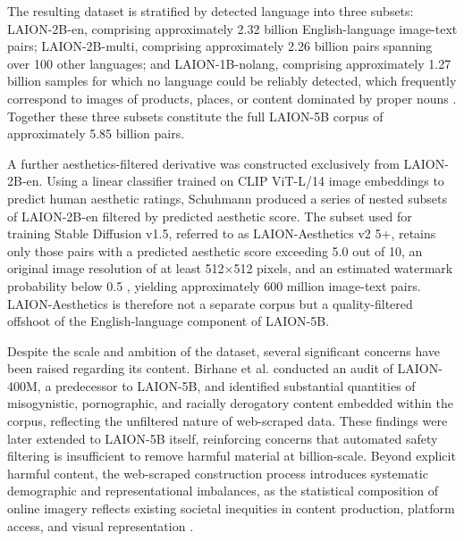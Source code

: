 The resulting dataset is stratified by detected language into three subsets: LAION-2B-en, comprising approximately 2.32 billion English-language image-text pairs; LAION-2B-multi, comprising approximately 2.26 billion pairs spanning over 100 other languages; and LAION-1B-nolang, comprising approximately 1.27 billion samples for which no language could be reliably detected, which frequently correspond to images of products, places, or content dominated by proper nouns \cite{Schuhmann_2022_Laion5b}. Together these three subsets constitute the full LAION-5B corpus of approximately 5.85 billion pairs.

A further aesthetics-filtered derivative was constructed exclusively from LAION-2B-en. Using a linear classifier trained on CLIP ViT-L/14 image embeddings to predict human aesthetic ratings, Schuhmann \cite{Schuhmann_2022_LaionAesthetics} produced a series of nested subsets of LAION-2B-en filtered by predicted aesthetic score. The subset used for training Stable Diffusion v1.5, referred to as LAION-Aesthetics v2 5+, retains only those pairs with a predicted aesthetic score exceeding 5.0 out of 10, an original image resolution of at least 512$\times$512 pixels, and an estimated watermark probability below 0.5 \cite{StableDiffusion_2022_SD15modelcard}, yielding approximately 600 million image-text pairs. LAION-Aesthetics is therefore not a separate corpus but a quality-filtered offshoot of the English-language component of LAION-5B.


Despite the scale and ambition of the dataset, several significant concerns have been raised regarding its content. Birhane et al. \cite{Birhane_2021_MultiModalDatasetsMisogynyPornography} conducted an audit of LAION-400M, a predecessor to LAION-5B, and identified substantial quantities of misogynistic, pornographic, and racially derogatory content embedded within the corpus, reflecting the unfiltered nature of web-scraped data. These findings were later extended to LAION-5B itself, reinforcing concerns that automated safety filtering is insufficient to remove harmful material at billion-scale. Beyond explicit harmful content, the web-scraped construction process introduces systematic demographic and representational imbalances, as the statistical composition of online imagery reflects existing societal inequities in content production, platform access, and visual representation \cite{Birhane_2021_MultiModalDatasetsMisogynyPornography, Mehrabi_2022_SurveyBiasFairnessMachine}.

